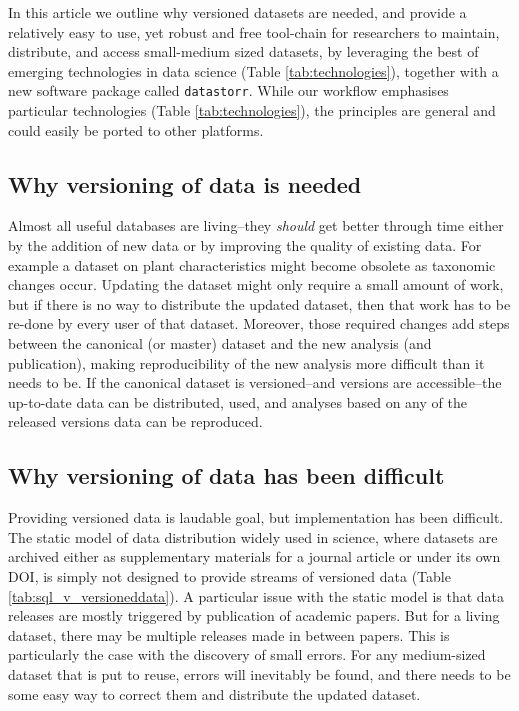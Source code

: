 \documentclass[a4paper,11pt]{article}
\begin{document}
In this article we outline why versioned datasets are needed, and provide a relatively easy to use, yet robust and free tool-chain for researchers to maintain, distribute, and access small-medium sized datasets, by leveraging the best of emerging technologies in data science (Table \ref{tab:technologies}), together with a new software package called \texttt{datastorr}. While our workflow emphasises particular technologies (Table \ref{tab:technologies}), the principles are general and could easily be ported to other platforms.

\subsection{Why versioning of data is needed}

Almost all useful databases are living--they \emph{should} get better
through time either by the addition of new data or by improving the
quality of existing data. For example a dataset on plant characteristics
might become obsolete as taxonomic changes occur. Updating the dataset might only
require a small amount of work, but if there is no
way to distribute the updated dataset, then that work has to be re-done by
every user of that dataset. Moreover, those required changes add steps
between the canonical (or master) dataset and the new analysis (and publication),
making reproducibility of the new analysis more difficult than it needs
to be. If the canonical dataset is versioned--and versions are
accessible--the up-to-date data can be distributed, used, and analyses
based on any of the released versions data can be reproduced.

\subsection{Why versioning of data has been difficult}

Providing versioned data is laudable goal, but implementation has been
difficult. The static model of data distribution widely used in science, where
datasets are archived either as supplementary materials for a journal article
or under its own DOI, is simply not designed to provide streams of versioned
data (Table \ref{tab:sql_v_versioneddata}). A particular issue with the static
model is that data releases are mostly triggered by publication of academic
papers. But for a living dataset, there may be multiple releases made in
between papers. This is particularly the case with the discovery of small
errors. For any medium-sized dataset that is put to reuse, errors will
inevitably be found, and there needs to be some easy  way to correct them and
distribute the updated dataset.
\end{document}
